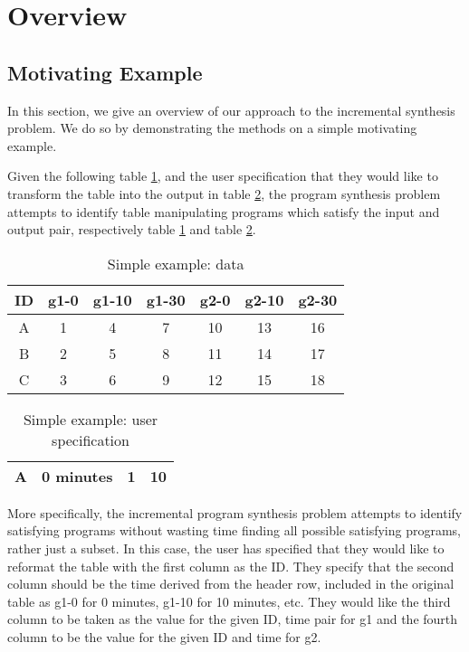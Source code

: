 \section{Overview}
\label{sec:overview}

\subsection{Motivating Example}
In this section, we give an overview of our approach to the incremental synthesis problem. We do so by demonstrating the methods on a simple motivating example.

Given the following table \ref{table:1}, and the user specification that they would like to transform the table into the output in table \ref{table:2}, the program synthesis problem attempts to identify table manipulating programs which satisfy the input and output pair, respectively table \ref{table:1} and table \ref{table:2}.

\begin{table}[h]
\centering
\begin{tabular}{|c|c|c|c|c|c|c|}
\hline
ID & g1-0 & g1-10 & g1-30 & g2-0 & g2-10 & g2-30 \\
\hline
A & 1 & 4 & 7 & 10 & 13 & 16 \\
\hline
B & 2 & 5 & 8 & 11 & 14 & 17 \\
\hline
C & 3 & 6 & 9 & 12 & 15 & 18 \\
\hline
\end{tabular}
\caption{Simple example: data}
\label{table:1}
\end{table}

\begin{table}[h]
\centering
\begin{tabular}{|c|c|c|c|}
\hline
A & 0 minutes & 1 & 10  \\
\hline
\end{tabular}
\caption{Simple example: user specification}
\label{table:2}
\end{table}

More specifically, the incremental program synthesis problem attempts to identify satisfying programs without wasting time finding all possible satisfying programs, rather just a subset. In this case, the user has specified that they would like to reformat the table with the first column as the ID. They specify that the second column should be the time derived from the header row, included in the original table as g1-0 for 0 minutes, g1-10 for 10 minutes, etc. They would like the third column to be taken as the value for the given ID, time pair for g1 and the fourth column to be the value for the given ID and time for g2.

